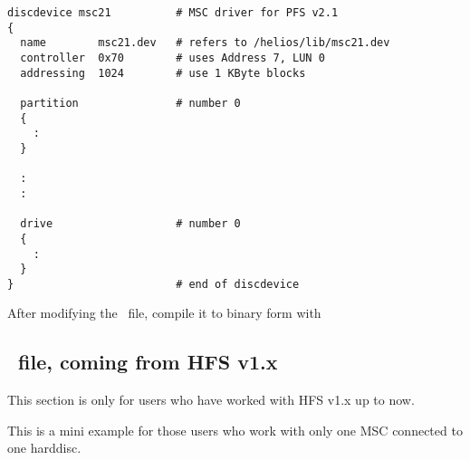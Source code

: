 \begin{listing}
  \begin{verbatim}
discdevice msc21          # MSC driver for PFS v2.1
{
  name        msc21.dev   # refers to /helios/lib/msc21.dev
  controller  0x70        # uses Address 7, LUN 0
  addressing  1024        # use 1 KByte blocks

  partition               # number 0
  {
    :
  }

  :
  :

  drive                   # number 0
  {
    :
  }
}                         # end of discdevice
  \end{verbatim}
\end{listing}

After modifying the \DIS\ file, compile it to binary form with


\subsection{\DI\ file, coming from HFS v1.x}
This section is only for users who have worked with HFS v1.x up to now.

\begin{caution}
  This is a mini example for those users who work with only one MSC connected
  to one harddisc.
\end{caution}

